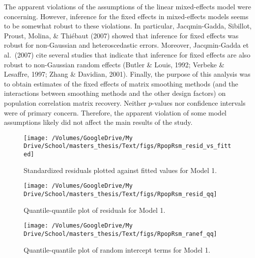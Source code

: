 \documentclass[
  english,
  man]{apa6}
\begin{document}
\begin{appendix}
The apparent violations of the assumptions of the linear mixed-effects
model were concerning. However, inference for the fixed effects in
mixed-effects models seems to be somewhat robust to these violations. In
particular, Jacqmin-Gadda, Sibillot, Proust, Molina, \& Thiébaut (2007)
showed that inference for fixed effects was robust for non-Gaussian and
heteroscedastic errors. Moreover, Jacqmin-Gadda et al.~(2007) cite
several studies that indicate that inference for fixed effects are also
robust to non-Gaussian random effects (Butler \& Louis, 1992; Verbeke \&
Lesaffre, 1997; Zhang \& Davidian, 2001). Finally, the purpose of this
analysis was to obtain estimates of the fixed effects of matrix
smoothing methods (and the interactions between smoothing methods and
the other design factors) on population correlation matrix recovery.
Neither \(p\)-values nor confidence intervals were of primary concern.
Therefore, the apparent violation of some model assumptions likely did
not affect the main results of the study.

\begin{figure}

{\centering \texttt{[image: /Volumes/GoogleDrive/My Drive/School/masters\_thesis/Text/figs/RpopRsm\_resid\_vs\_fitted]} 

}

\caption{Standardized residuals plotted against fitted values for Model 1.}\label{fig:residuals-vs-fitted-RpopRsm}
\end{figure}

\begin{figure}

{\centering \texttt{[image: /Volumes/GoogleDrive/My Drive/School/masters\_thesis/Text/figs/RpopRsm\_resid\_qq]} 

}

\caption{Quantile-quantile plot of residuals for Model 1.}\label{fig:qq-plot-RpopRsm}
\end{figure}

\begin{figure}

{\centering \texttt{[image: /Volumes/GoogleDrive/My Drive/School/masters\_thesis/Text/figs/RpopRsm\_ranef\_qq]} 

}

\caption{Quantile-quantile plot of random intercept terms for Model 1.}\label{fig:qq-plot-randInt-RpopRsm}
\end{figure}

\hypertarget{model-2-regression-model-predicting-log-textrmrmsemathbflambda-hatmathbflambda}{%
}
\end{appendix}
\end{document}

